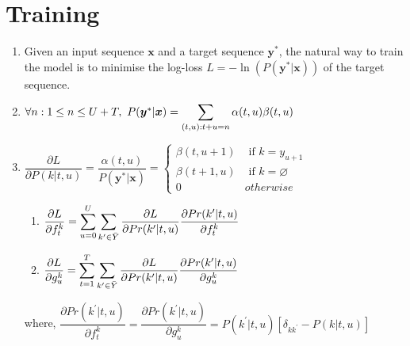 \section{Training}

\begin{enumerate}
    \item Given an input sequence $\bm{x}$ and a target sequence $\bm{y}^\ast$, the natural way to train the model is to minimise the log-loss $L = - \ln (P(\bm{y}^\ast|\bm{x}))$ of the target sequence.
    \hfill \cite{arxiv/1211.3711/Sequence-Transduction-RNN}

    \item $\forall n : 1 \leq n \leq U + T,\ P(\bm{y}^\ast|\bm{x}) = \dsum_{(t,u):t+u=n} \alpha(t, u)\beta(t, u) $
    \hfill \cite{arxiv/1211.3711/Sequence-Transduction-RNN}

    \item $
        \dfrac{\partial L}{\partial P(k|t, u)}
        = \dfrac{\alpha(t, u)}{P(\bm{y}^\ast|\bm{x})}
        = \begin{cases}
            \beta(t, u + 1) & \text{ if } k = y_{u+1} \\
            \beta(t + 1, u) & \text{ if } k = \varnothing \\
            0 & otherwise
        \end{cases}
    $
    \hfill \cite{arxiv/1211.3711/Sequence-Transduction-RNN}
    \begin{multicols}{2}
    \begin{enumerate}
        \item 
        $
            \dfrac{\partial L}{\partial f ^k_t} = 
            \displaystyle\sum_{u=0}^U \displaystyle\sum_{k^\prime \in \bar{Y}}
            \dfrac{\partial L}{\partial  Pr(k^\prime |t, u)} \dfrac{\partial  Pr(k^\prime |t, u)}{\partial f ^k_t}
        $
        \hfill \cite{arxiv/1211.3711/Sequence-Transduction-RNN}

        \item 
        $
            \dfrac{\partial L}{\partial g ^k_u} = 
            \displaystyle\sum_{t=1}^T \displaystyle\sum_{k^\prime \in \bar{Y}}
            \dfrac{\partial L}{\partial  Pr(k^\prime |t, u)} \dfrac{\partial  Pr(k^\prime |t, u)}{\partial g ^k_u}
        $
        \hfill \cite{arxiv/1211.3711/Sequence-Transduction-RNN}
    \end{enumerate}
    \end{multicols}
    where, 
    $
        \dfrac{\partial  Pr(k^\prime |t, u)}{\partial f ^k_t}
        = \dfrac{\partial  Pr(k^\prime |t, u)}{\partial g ^k_u}
        = P(k^\prime|t, u) [\delta_{kk^\prime} - P(k|t, u)]
    $
    \hfill \cite{arxiv/1211.3711/Sequence-Transduction-RNN}


\end{enumerate}
